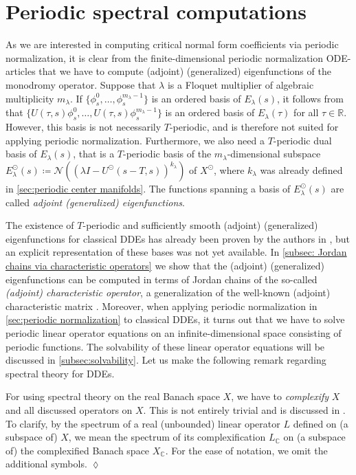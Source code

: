 \documentclass[english]{myarticle}
\begin{document}
\begin{sloppypar}
\section{Periodic spectral computations} \label{sec:periodic spectral computations}
As we are interested in computing critical normal form coefficients via periodic normalization, it is clear from the finite-dimensional periodic normalization ODE-articles \cite{Kuznetsov2005,Witte2013,Witte2014} that we have to compute (adjoint) (generalized) eigenfunctions of the monodromy operator. Suppose that $\lambda$ is a Floquet multiplier of algebraic multiplicity $m_\lambda$. If $\{\phi_s^0,\dots,\phi_s^{m_\lambda - 1} \}$ is an ordered basis of $E_\lambda(s)$, it follows from \cite[Theorem XIII.3.3]{Diekmann1995} that $\{U(\tau,s)\phi_s^0,\dots,U(\tau,s)\phi_s^{m_\lambda - 1} \}$ is an ordered basis of $E_\lambda(\tau)$ for all $\tau \in \mathbb{R}$. However, this basis is not necessarily $T$-periodic, and is therefore not suited for applying periodic normalization. Furthermore, we also need a $T$-periodic dual basis of $E_\lambda(s)$, that is a $T$-periodic basis of the $m_\lambda$-dimensional subspace $E_\lambda^\odot(s) \coloneqq \mathcal{N}((\lambda I - U^\odot(s-T,s))^{k_\lambda})$ of $X^\odot$, where $k_\lambda$ was already defined in \cref{sec:periodic center manifolds}. The functions spanning a basis of $E_\lambda^\odot(s)$ are called \emph{adjoint (generalized) eigenfunctions}. 

The existence of $T$-periodic and sufficiently smooth (adjoint) (generalized) eigenfunctions for classical DDEs has already been proven by the authors in \cite{Article2}, but an explicit representation of these bases was not yet available. In \cref{subsec: Jordan chains via characteristic operators} we show that the (adjoint) (generalized) eigenfunctions can be computed in terms of Jordan chains of the so-called \emph{(adjoint) characteristic operator}, a generalization of the well-known (adjoint) characteristic matrix \cite{Diekmann1995,Kaashoek1992,Kaashoek2022}. Moreover, when applying periodic normalization in \cref{sec:periodic normalization} to classical DDEs, it turns out that we have to solve periodic linear operator equations on an infinite-dimensional space consisting of periodic functions. The solvability of these linear operator equations will be discussed in \cref{subsec:solvability}. Let us make the following remark regarding spectral theory for DDEs.

\begin{remark} \label{remark:complexification} 
For using spectral theory on the real Banach space $X$, we have to \emph{complexify} $X$ and all discussed operators on $X$. This is not entirely trivial and is discussed in \cite[Section III.7 and Section IV.2]{Diekmann1995}. To clarify, by the spectrum of a real (unbounded) linear operator $L$ defined on (a subspace of) $X$, we mean the spectrum of its complexification $L_\mathbb{C}$ on (a subspace of) the complexified Banach space $X_\mathbb{C}$. For the ease of notation, we omit the additional symbols. \hfill $\lozenge$
\end{remark}


\end{sloppypar}
\end{document}
